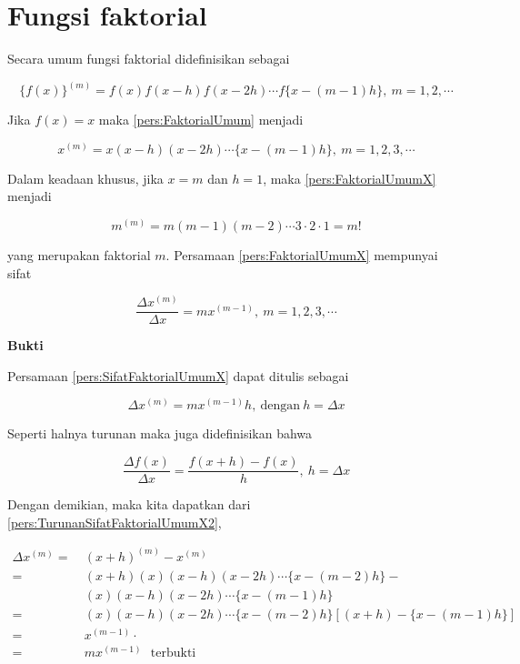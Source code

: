 \section{Fungsi faktorial}
Secara umum fungsi faktorial didefinisikan sebagai

\begin{equation}\label{pers:FaktorialUmum}
\{f(x)\}^{(m)} = f(x)f(x-h)f(x-2h)\cdots f\{x-(m-1)h\},~m = 1,2,\cdots
\end{equation}

Jika $f(x)=x$ maka \ref{pers:FaktorialUmum} menjadi

\begin{equation}\label{pers:FaktorialUmumX}
x^{(m)} = x(x-h)(x-2h)\cdots\{x-(m-1)h\},~m=1,2,3,\cdots
\end{equation}

Dalam keadaan khusus, jika $x=m$ dan $h=1$, maka \ref{pers:FaktorialUmumX} menjadi

\begin{equation}\label{pers:FaktorialUmumM}
m^{(m)} = m(m-1)(m-2)\cdots3\cdot2\cdot1=m!
\end{equation}

yang merupakan faktorial $m$. Persamaan \ref{pers:FaktorialUmumX} mempunyai sifat

\begin{equation}\label{pers:SifatFaktorialUmumX}
\boxed{\frac{\Delta x^{(m)}}{\Delta x} = mx^{(m-1)}},~ m=1,2,3,\cdots
\end{equation}

\textbf{Bukti}

Persamaan \ref{pers:SifatFaktorialUmumX} dapat ditulis sebagai

\begin{equation}\label{pers:SifatFaktorialUmumX2}
	\Delta x^{(m)} = mx^{(m-1)}h, ~\text{dengan} ~h = \Delta x
\end{equation}

Seperti halnya turunan maka juga didefinisikan bahwa

\begin{equation}\label{pers:TurunanSifatFaktorialUmumX2}
\frac{\Delta f(x)}{\Delta x} = \frac{f(x+h)-f(x)}{h},~h=\Delta x
\end{equation}

Dengan demikian, maka kita dapatkan dari \ref{pers:TurunanSifatFaktorialUmumX2},

\begin{equation*}
\begin{split}
\Delta x^{(m)} =~& (x+h)^{(m)} - x^{(m)}\\
=~&(x+h)(x)(x-h)(x-2h)\cdots\{x-(m-2)h\}-\\
&(x)(x-h)(x-2h)\cdots\{x-(m-1)h\}\\
=~&(x)(x-h)(x-2h)\cdots\{x-(m-2)h\}[(x+h)-\{x-(m-1)h\}]\\
=~&x^{(m-1)}\cdot\\
=~& mx^{(m-1)}~~~\text{terbukti}
\end{split}
\end{equation*}


